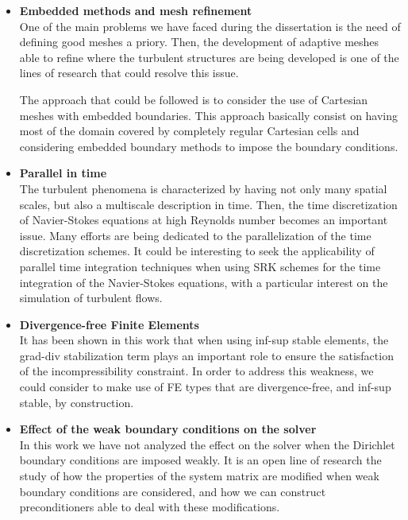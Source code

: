 \begin{itemize}
\item {\bf Embedded methods and mesh refinement}\\
One of the main problems we have faced during the dissertation is the need of defining good meshes a priory. Then, the development of adaptive meshes able to refine where the turbulent structures are being developed is one of the lines of research that could resolve this issue.

The approach that could be followed is to consider the use of Cartesian meshes with embedded boundaries. This approach basically consist on having most of the domain covered by completely regular Cartesian cells and considering embedded boundary methods to impose the boundary conditions.

\item {\bf Parallel in time}\\
The turbulent phenomena is characterized by having not only many spatial scales, but also a multiscale description in time. Then, the time discretization of Navier-Stokes equations at high Reynolds number becomes an important issue. Many efforts are being dedicated to the parallelization of the time discretization schemes. It could be interesting to seek the applicability of parallel time integration techniques when using SRK schemes for the time integration of the Navier-Stokes equations, with a particular interest on the simulation of turbulent flows.

\item {\bf Divergence-free Finite Elements}\\
It has been shown in this work that when using inf-sup stable elements, the grad-div stabilization term plays an important role to ensure the satisfaction of the incompressibility constraint. In order to address this weakness, we could consider to make use of FE types that are divergence-free, and inf-sup stable, by construction.

\item {\bf Effect of the weak boundary conditions on the solver}\\
In this work we have not analyzed the effect on the solver when the Dirichlet boundary conditions are imposed weakly. It is an open line of research the study of how the properties of the system matrix are modified when weak boundary conditions are considered, and how we can construct preconditioners able to deal with these modifications.

\end{itemize}
